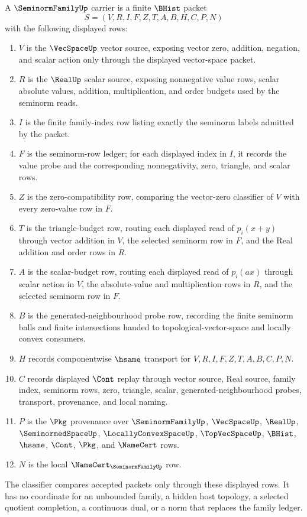 \begin{definition}
\label{def:seminorm-family-carrier}
A $\SeminormFamilyUp$ carrier is a finite $\BHist$ packet
$$
S=(V,R,I,F,Z,T,A,B,H,C,P,N)
$$
with the following displayed rows:
\begin{enumerate}
\item $V$ is the $\VecSpaceUp$ vector source, exposing vector zero, addition, negation, and scalar action only through the displayed vector-space packet.
\item $R$ is the $\RealUp$ scalar source, exposing nonnegative value rows, scalar absolute values, addition, multiplication, and order budgets used by the seminorm reads.
\item $I$ is the finite family-index row listing exactly the seminorm labels admitted by the packet.
\item $F$ is the seminorm-row ledger; for each displayed index in $I$, it records the value probe and the corresponding nonnegativity, zero, triangle, and scalar rows.
\item $Z$ is the zero-compatibility row, comparing the vector-zero classifier of $V$ with every zero-value row in $F$.
\item $T$ is the triangle-budget row, routing each displayed read of $p_i(x+y)$ through vector addition in $V$, the selected seminorm row in $F$, and the Real addition and order rows in $R$.
\item $A$ is the scalar-budget row, routing each displayed read of $p_i(ax)$ through scalar action in $V$, the absolute-value and multiplication rows in $R$, and the selected seminorm row in $F$.
\item $B$ is the generated-neighbourhood probe row, recording the finite seminorm balls and finite intersections handed to topological-vector-space and locally convex consumers.
\item $H$ records componentwise $\hsame$ transport for $V,R,I,F,Z,T,A,B,C,P,N$.
\item $C$ records displayed $\Cont$ replay through vector source, Real source, family index, seminorm rows, zero, triangle, scalar, generated-neighbourhood probes, transport, provenance, and local naming.
\item $P$ is the $\Pkg$ provenance over $\SeminormFamilyUp$, $\VecSpaceUp$, $\RealUp$, $\SeminormedSpaceUp$, $\LocallyConvexSpaceUp$, $\TopVecSpaceUp$, $\BHist$, $\hsame$, $\Cont$, $\Pkg$, and $\NameCert$ rows.
\item $N$ is the local $\NameCert_{\SeminormFamilyUp}$ row.
\end{enumerate}
The classifier compares accepted packets only through these displayed rows. It has no coordinate for an unbounded family, a hidden host topology, a selected quotient completion, a continuous dual, or a norm that replaces the family ledger.
\end{definition}

